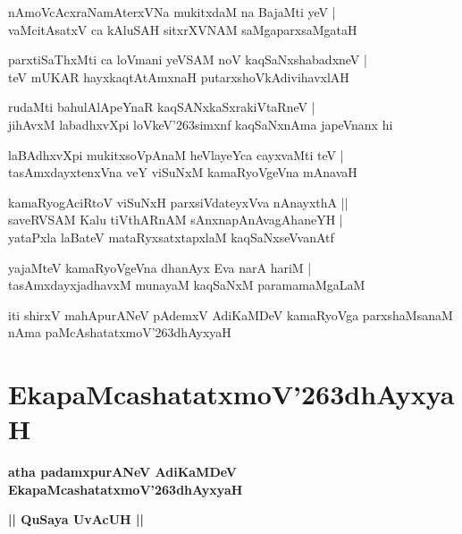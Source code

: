 \documentclass[twoside,12pt,openright]{book}
\def\S{\char'263}
\newcounter{shloka}[chapter]
\def\uvaca#1{\centerline{{\large\textbf{#1}}}}
\begin{document}
\begin{shloka}
nAmoVcAcxraNamAterxVNa mukitxdaM na BajaMti yeV |\\
vaMcitAsatxV ca kAluSAH sitxrXVNAM saMgaparxsaMgataH 
\end{shloka}

\begin{shloka}
parxtiSaThxMti ca loVmani yeVSAM noV kaqSaNxshabadxneV |\\
teV mUKAR hayxkaqtAtAmxnaH putarxshoVkAdivihavxlAH 
\end{shloka}

\begin{shloka}
rudaMti bahulAlApeYnaR kaqSANxkaSxrakiVtaRneV |\\
jihAvxM labadhxvXpi loVkeV\S simxnf kaqSaNxnAma japeVnanx hi
\end{shloka}

\begin{shloka}
laBAdhxvXpi mukitxsoVpAnaM heVlayeYca cayxvaMti teV |\\
tasAmxdayxtenxVna veY viSuNxM kamaRyoVgeVna mAnavaH 
\end{shloka}

\begin{shloka}
kamaRyogAciRtoV viSuNxH parxsiVdateyxVva nAnayxthA ||\\
saveRVSAM Kalu tiVthARnAM sAnxnapAnAvagAhaneYH |\\
yataPxla laBateV mataRyxsatxtapxlaM kaqSaNxseVvanAtf
\end{shloka}

\begin{shloka}
yajaMteV kamaRyoVgeVna dhanAyx Eva narA hariM |\\
tasAmxdayxjadhavxM munayaM kaqSaNxM paramamaMgaLaM 
\end{shloka}

\begin{center}
iti shirxV mahApurANeV pAdemxV AdiKaMDeV kamaRyoVga parxshaMsanaM nAma paMcAshatatxmoV\S dhAyxyaH 
\end{center}

\chapter{EkapaMcashatatxmoV\S dhAyxyaH}

\begin{center}
{\LARGE\bfseries atha padamxpurANeV AdiKaMDeV EkapaMcashatatxmoV\S dhAyxyaH}
\end{center}

\uvaca{|| QuSaya UvAcUH ||}
\end{document}
